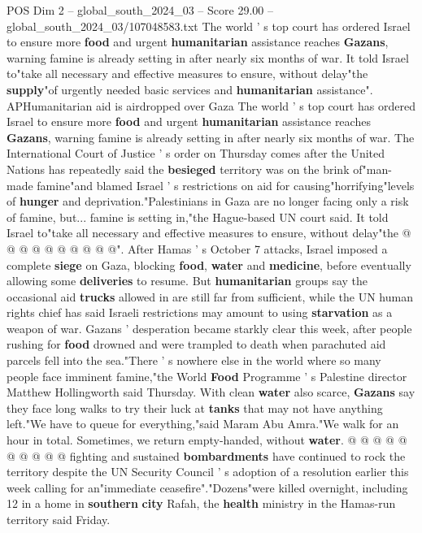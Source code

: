 \begin{textsample}{POS Dim 2 – global\_south\_2024\_03 – Score 29.00 – global\_south\_2024\_03/107048583.txt}  \label{ex:f2_pos_003}
The world ' s top court has ordered Israel to ensure more \textbf{food} and urgent \textbf{humanitarian} assistance reaches \textbf{Gazans}, warning famine is already setting in after nearly six months of war.
It told Israel to"take all necessary and effective measures to ensure, without delay"the \textbf{supply}"of urgently needed basic services and \textbf{humanitarian} assistance".
APHumanitarian aid is airdropped over Gaza The world ' s top court has ordered Israel to ensure more \textbf{food} and urgent \textbf{humanitarian} assistance reaches \textbf{Gazans}, warning famine is already setting in after nearly six months of war.
The International Court of Justice ' s order on Thursday comes after the United Nations has repeatedly said the \textbf{besieged} territory was on the brink of"man-made famine"and blamed Israel ' s restrictions on aid for causing"horrifying"levels of \textbf{hunger} and deprivation."Palestinians in Gaza are no longer facing only a risk of famine, but... famine is setting in,"the Hague-based UN court said.
It told Israel to"take all necessary and effective measures to ensure, without delay"the @ @ @ @ @ @ @ @ @ @".
After Hamas ' s October 7 attacks, Israel imposed a complete \textbf{siege} on Gaza, blocking \textbf{food}, \textbf{water} and \textbf{medicine}, before eventually allowing some \textbf{deliveries} to resume.
But \textbf{humanitarian} groups say the occasional aid \textbf{trucks} allowed in are still far from sufficient, while the UN human rights chief has said Israeli restrictions may amount to using \textbf{starvation} as a weapon of war.
Gazans ' desperation became starkly clear this week, after people rushing for \textbf{food} drowned and were trampled to death when parachuted aid parcels fell into the sea."There ' s nowhere else in the world where so many people face imminent famine,"the World \textbf{Food} Programme ' s Palestine director Matthew Hollingworth said Thursday.
With clean \textbf{water} also scarce, \textbf{Gazans} say they face long walks to try their luck at \textbf{tanks} that may not have anything left."We have to queue for everything,"said Maram Abu Amra."We walk for an hour in total.
Sometimes, we return empty-handed, without \textbf{water}. @ @ @ @ @ @ @ @ @ @ fighting and sustained \textbf{bombardments} have continued to rock the territory despite the UN Security Council ' s adoption of a resolution earlier this week calling for an"immediate ceasefire"."Dozens"were killed overnight, including 12 in a home in \textbf{southern} \textbf{city} Rafah, the \textbf{health} ministry in the Hamas-run territory said Friday.

\end{textsample}
